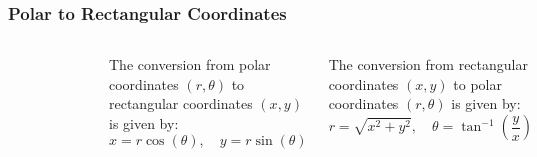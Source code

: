 \documentclass{beamer}
\begin{document}
\begin{frame}
\frametitle{Polar to Rectangular Coordinates}
\begin{columns}
        \begin{figure}
        \centering
        \includegraphics[width=\textwidth]{polar2.png}
        \end{figure}
    \begin{definition}
        The conversion from polar coordinates \((r, \theta)\) to rectangular coordinates \((x, y)\) is given by:
        \[
        x = r \cos(\theta), \quad y = r \sin(\theta)
        \]
    \end{definition}
    \begin{definition}
        The conversion from rectangular coordinates \((x, y)\) to polar coordinates \((r, \theta)\) is given by:
        \[
        r = \sqrt{x^2 + y^2}, \quad \theta = \tan^{-1}\left(\frac{y}{x}\right)
        \]
    \end{definition}
\end{columns}
\end{frame}
\end{document}
